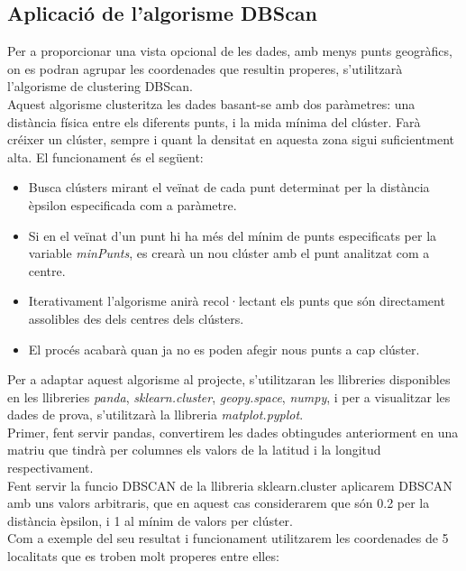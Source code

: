 \documentclass[12pt,a4paper,openright,oneside]{article}
\numberwithin{equation}{section}
\theoremstyle{definition}
\begin{document}
\subsection{Aplicació de l'algorisme DBScan}
Per a proporcionar una vista opcional de les dades, amb menys punts geogràfics, on es podran agrupar les coordenades que resultin properes, s'utilitzarà l'algorisme de clustering DBScan.\\
Aquest algorisme clusteritza les dades basant-se amb dos paràmetres: una distància física entre els diferents punts, i la mida mínima del clúster. Farà créixer un clúster, sempre i quant la densitat en aquesta zona sigui suficientment alta. El funcionament és el següent:
\begin{itemize}
\item Busca clústers mirant el veïnat de cada punt determinat per la distància èpsilon especificada com a paràmetre.
\item Si en el veïnat d'un punt hi ha més del mínim de punts especificats per la variable \emph{minPunts}, es crearà un nou clúster amb el punt analitzat com a centre.
\item Iterativament l'algorisme anirà recol·lectant els punts que són directament assolibles des dels centres dels clústers.
\item El procés acabarà quan ja no es poden afegir nous punts a cap clúster.
\end{itemize}
Per a adaptar aquest algorisme al projecte, s'utilitzaran les llibreries disponibles en les llibreries \emph{panda}, \emph{sklearn.cluster}, \emph{geopy.space}, \emph{numpy}, i per a visualitzar les dades de prova, s'utilitzarà la llibreria \emph{matplot.pyplot}\cite{panda}.\\
Primer, fent servir pandas, convertirem les dades obtingudes anteriorment en una matriu que tindrà per columnes els valors de la latitud i la longitud respectivament.\\
Fent servir la funcio DBSCAN de la llibreria sklearn.cluster aplicarem DBSCAN amb uns valors arbitraris, que en aquest cas considerarem que són 0.2 per la distància èpsilon, i 1 al mínim de valors per clúster.\\
Com a exemple del seu resultat i funcionament utilitzarem les coordenades de 5 localitats que es troben molt properes entre elles:
\end{document}

